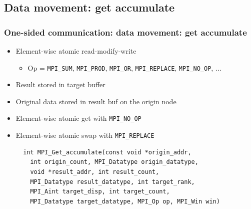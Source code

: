 \documentclass{beamer}
\begin{document}
\subsection{Data movement: get accumulate}
\begin{frame}[fragile]
  \frametitle{One-sided communication: data movement: get accumulate}
\begin{itemize}
\item Element-wise atomic read-modify-write
\begin{itemize}
\item Op = {\color{mycolorcode}\verb|MPI_SUM|}, {\color{mycolorcode}\verb|MPI_PROD|}, {\color{mycolorcode}\verb|MPI_OR|}, {\color{mycolorcode}\verb|MPI_REPLACE|},
{\color{mycolorcode}\verb|MPI_NO_OP|}, ...
\end{itemize}
\item Result stored in target buffer
\item Original data stored in result buf on the origin node
\item Element-wise atomic get with {\color{mycolorcode}\verb|MPI_NO_OP|}
\item Element-wise atomic swap with {\color{mycolorcode}\verb|MPI_REPLACE|}
{\color{mycolorcode}
\begin{verbatim}
  int MPI_Get_accumulate(const void *origin_addr, 
    int origin_count, MPI_Datatype origin_datatype, 
    void *result_addr, int result_count, 
    MPI_Datatype result_datatype, int target_rank, 
    MPI_Aint target_disp, int target_count,
    MPI_Datatype target_datatype, MPI_Op op, MPI_Win win)
\end{verbatim}
}
\end{itemize}
\end{frame}
\end{document}
